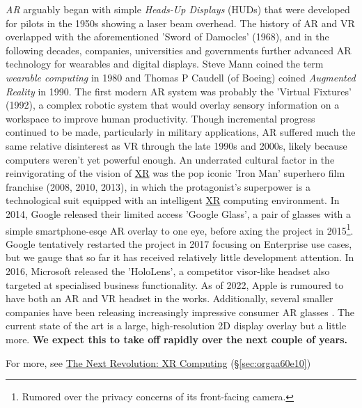 \documentclass[logo,bsc,singlespacing,parskip]{infthesis}
\begin{document}
\emph{AR} arguably began with simple \emph{Heads-Up Displays} (HUDs) that were developed for pilots in the 1950s showing a laser beam overhead.
The history of AR and VR overlapped with the aforementioned 'Sword of Damocles' (1968), and in the following decades, companies, universities and governments further advanced AR technology for wearables and digital displays.
Steve Mann coined the term \emph{wearable computing} in 1980 and Thomas P Caudell (of Boeing) coined \emph{Augmented Reality} in 1990.
The first modern AR system was probably the 'Virtual Fixtures' (1992), a complex robotic system that would overlay sensory information on a workspace to improve human productivity.
Though incremental progress continued to be made, particularly in military applications, AR suffered much the same relative disinterest as VR through the late 1990s and 2000s, likely because computers weren't yet powerful enough.
An underrated cultural factor in the reinvigorating of the vision of \hyperref[org88b0f70]{XR} was the pop iconic 'Iron Man' superhero film franchise (2008, 2010, 2013),  in which the protagonist's superpower is a technological suit equipped with an intelligent \hyperref[org88b0f70]{XR} computing environment.
In 2014, Google released their limited access 'Google Glass', a pair of glasses with a simple smartphone-esqe AR overlay to one eye, before axing the project in 2015\footnote{Rumored over the privacy concerns of its front-facing camera.}.
Google tentatively restarted the project in 2017 focusing on Enterprise use cases, but we gauge that so far it has received relatively little development attention.
In 2016, Microsoft released the 'HoloLens', a competitor visor-like headset also targeted at specialised business functionality.
As of 2022, Apple is rumoured to have both an AR and VR headset in the works.
Additionally, several smaller companies have been releasing increasingly impressive consumer AR glasses \autocites{NrealAir}[][]{INMOAIRWorld}[][]{VuzixBladeUpgraded}.
The current state of the art is a large, high-resolution 2D display overlay but a little more.
\textbf{We expect this to take off rapidly over the next couple of years.}

For more, see \hyperref[sec:orgaa60e10]{The Next Revolution: XR Computing} (\S \ref{sec:orgaa60e10})
\end{document}
